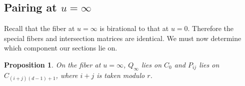 \documentclass[reqno]{amsart}
\newtheorem{proposition}[thm]{Proposition}
\theoremstyle{definition}
\theoremstyle{remark}
\begin{document}


   


\subsection{Pairing at $u=\infty$}
\label{sec:pairing-at-u=infty}

Recall that the fiber at $u=\infty$ is birational to that at $u=0$. Therefore the special fibers and intersection matrices are identical. We must now determine which component our sections lie on.
\begin{proposition}
  On the fiber at $u=\infty$, $Q_\infty$ lies on $C_0$ and $P_{ij}$ lies on $C_{(i+j)(d-1) +1}$, where $i+j$ is taken modulo $r$. 
\end{proposition}
\end{document}
